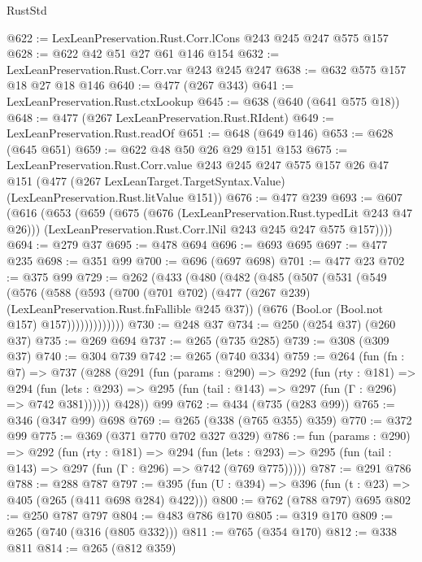 \begin{lexlean}{RustStd}
\begin{coremodule}
{\begin{coremodule}
{{{{{{@622 := LexLeanPreservation.Rust.Corr.lCons @243 @245 @247 @575 @157
@628 := @622 @42 @51 @27 @61 @146 @154
@632 := LexLeanPreservation.Rust.Corr.var @243 @245 @247
@638 := @632 @575 @157 @18 @27 @18 @146
@640 := @477 (@267 @343)
@641 := LexLeanPreservation.Rust.ctxLookup
@645 := @638 (@640 (@641 @575 @18))
@648 := @477 (@267 LexLeanPreservation.Rust.RIdent)
@649 := LexLeanPreservation.Rust.readOf
@651 := @648 (@649 @146)
@653 := @628 (@645 @651)
@659 := @622 @48 @50 @26 @29 @151 @153
@675 := LexLeanPreservation.Rust.Corr.value
    @243
    @245
    @247
    @575
    @157
    @26
    @47
    @151
    (@477 (@267 LexLeanTarget.TargetSyntax.Value) (LexLeanPreservation.Rust.litValue @151))
@676 := @477 @239
@693 := @607
    (@616
      (@653
        (@659
          (@675 (@676 (LexLeanPreservation.Rust.typedLit @243 @47 @26)))
          (LexLeanPreservation.Rust.Corr.lNil @243 @245 @247 @575 @157))))
@694 := @279 @37
@695 := @478 @694
@696 := @693 @695
@697 := @477 @235
@698 := @351 @99
@700 := @696 (@697 @698)
@701 := @477 @23
@702 := @375 @99
@729 := @262
    (@433
      (@480
        (@482
          (@485
            (@507
              (@531
                (@549
                  (@576
                    (@588
                      (@593
                        (@700
                          (@701 @702)
                          (@477 (@267 @239) (LexLeanPreservation.Rust.fnFallible @245 @37))
                          (@676 (Bool.or (Bool.not @157) @157)))))))))))))
@730 := @248 @37
@734 := @250 (@254 @37) (@260 @37)
@735 := @269 @694
@737 := @265 (@735 @285)
@739 := @308 (@309 @37)
@740 := @304 @739
@742 := @265 (@740 @334)
@759 := @264
    (fun (fn : @7) =>
    @737
      (@288
        (@291
          (fun (params : @290) =>
          @292
            (fun (rty : @181) =>
            @294
              (fun (lets : @293) =>
              @295 (fun (tail : @143) => @297 (fun (Γ : @296) => @742 @381))))))
        @428))
    @99
@762 := @434 (@735 (@283 @99))
@765 := @346 (@347 @99) @698
@769 := @265 (@338 (@765 @355) @359)
@770 := @372 @99
@775 := @369 (@371 @770 @702 @327 @329)
@786 := fun (params : @290) =>
  @292
    (fun (rty : @181) =>
    @294
      (fun (lets : @293) => @295 (fun (tail : @143) => @297 (fun (Γ : @296) => @742 (@769 @775)))))
@787 := @291 @786
@788 := @288 @787
@797 := @395 (fun (U : @394) => @396 (fun (t : @23) => @405 (@265 (@411 @698 @284) @422)))
@800 := @762 (@788 @797) @695
@802 := @250 @787 @797
@804 := @483 @786 @170
@805 := @319 @170
@809 := @265 (@740 (@316 (@805 @332)))
@811 := @765 (@354 @170)
@812 := @338 @811
@814 := @265 (@812 @359)
}}}}}}
\end{coremodule}}
\end{coremodule}
\end{lexlean}
